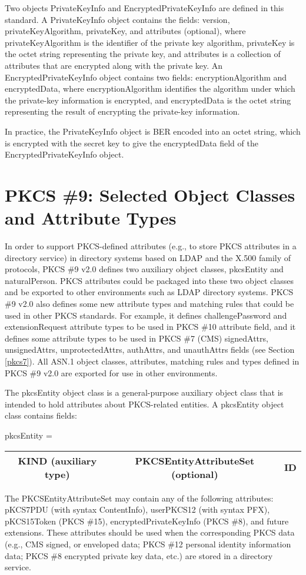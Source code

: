 \documentclass{article}
\begin{document}
Two objects PrivateKeyInfo and 
EncryptedPrivateKeyInfo are defined in this standard. 
A PrivateKeyInfo object
contains the fields: version, privateKeyAlgorithm, privateKey,
and attributes (optional), where privateKeyAlgorithm
is the identifier of the private key algorithm, privateKey
is the octet string representing the private key, and 
attributes is a collection of attributes that are encrypted
along with the private key.
An EncryptedPrivateKeyInfo object contains two fields:
encryptionAlgorithm and encryptedData,
where encryptionAlgorithm identifies the algorithm under 
which the private-key information is encrypted, and 
encryptedData is the octet string representing the result of 
encrypting the private-key information.

In practice, the PrivateKeyInfo object is BER encoded into an
octet string, which is encrypted with the secret key to give 
the encryptedData field of the EncryptedPrivateKeyInfo object.

\section{PKCS \#9: Selected Object Classes and Attribute Types}
\label{pkcs9}
In order to support PKCS-defined attributes (e.g., to store
PKCS attributes in a directory service) in 
directory systems based on LDAP and the X.500 family of protocols,
PKCS \#9 v2.0 defines two auxiliary object classes, {pkcsEntity} 
and {naturalPerson}. PKCS attributes could be packaged into these
two object classes and be exported to other environments
such as LDAP directory systems. PKCS \#9 v2.0 also defines 
some new attribute types and matching rules that could be used
in other PKCS standards. For example, it defines challengePassword and
extensionRequest attribute types to be used in PKCS \#10 attribute
field, and it defines some attribute types to 
be used in PKCS \#7 (CMS) signedAttrs, unsignedAttrs, 
unprotectedAttrs, authAttrs, and unauthAttrs fields (see 
Section \ref{pkcs7}).
All ASN.1 object classes, attributes, matching rules 
and types defined in PKCS \#9 v2.0 are exported for use 
in other environments.

The {pkcsEntity} object class is a general-purpose auxiliary
object class that is intended to hold attributes about PKCS-related
entities. A {pkcsEntity} object class contains 
fields:
\begin{center}
pkcsEntity = \begin{tabular}{|c|c|c|}\hline
KIND ({auxiliary} type) & PKCSEntityAttributeSet (optional) & ID \\ \hline
\end{tabular}
\end{center}
The {PKCSEntityAttributeSet} may contain any of the
following attributes:
{pKCS7PDU} (with syntax {ContentInfo}), 
{userPKCS12} (with syntax PFX), 
{pKCS15Token} (PKCS \#15), 
{encryptedPrivateKeyInfo} (PKCS \#8),
and future extensions. These attributes should be used
when the corresponding PKCS data (e.g., CMS signed, or enveloped data;
PKCS \#12 personal identity information data; PKCS \#8 encrypted 
private key data, etc.) 
are stored in a directory service.
\end{document}
